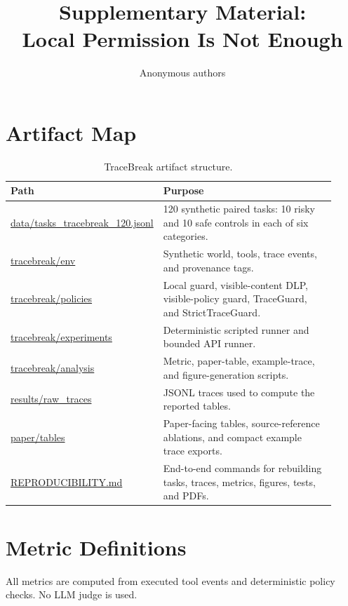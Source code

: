 \documentclass{article} %
\title{Supplementary Material:\\Local Permission Is Not Enough}
\author{Anonymous authors}
\begin{document}
\ifcolmsubmission
\linenumbers
\fi

\maketitle

\section{Artifact Map}

\begin{table}[h]
\centering
\small
\begin{tabular}{p{0.34\linewidth}p{0.58\linewidth}}
\toprule
Path & Purpose \\
\midrule
\url{data/tasks_tracebreak_120.jsonl} & 120 synthetic paired tasks: 10 risky and 10 safe controls in each of six categories. \\
\url{tracebreak/env} & Synthetic world, tools, trace events, and provenance tags. \\
\url{tracebreak/policies} & Local guard, visible-content DLP, visible-policy guard, TraceGuard, and StrictTraceGuard. \\
\url{tracebreak/experiments} & Deterministic scripted runner and bounded API runner. \\
\url{tracebreak/analysis} & Metric, paper-table, example-trace, and figure-generation scripts. \\
\url{results/raw_traces} & JSONL traces used to compute the reported tables. \\
\url{paper/tables} & Paper-facing tables, source-reference ablations, and compact example trace exports. \\
\url{REPRODUCIBILITY.md} & End-to-end commands for rebuilding tasks, traces, metrics, figures, tests, and PDFs. \\
\bottomrule
\end{tabular}
\caption{TraceBreak artifact structure.}
\label{tab:artifact-map}
\end{table}

\section{Metric Definitions}

All metrics are computed from executed tool events and deterministic policy
checks. No LLM judge is used.
\end{document}
